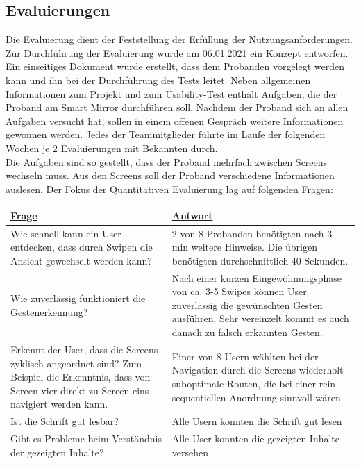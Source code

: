 \documentclass[12pt, a4paper]{scrartcl}
\begin{document}
	\subsection{Evaluierungen}
	Die Evaluierung dient der Feststellung der Erfüllung der Nutzungsanforderungen. Zur Durchführung der Evaluierung wurde am 06.01.2021 ein Konzept entworfen. Ein einseitiges Dokument wurde erstellt, dass dem Probanden vorgelegt werden kann und ihn bei der Durchführung des Tests leitet. Neben allgemeinen Informationen zum Projekt und zum Usability-Test enthält Aufgaben, die der Proband am Smart Mirror durchführen soll. Nachdem der Proband sich an allen Aufgaben versucht hat, sollen in einem offenen Gespräch weitere Informationen gewonnen werden. Jedes der Teammitglieder führte im Laufe der folgenden Wochen je 2 Evaluierungen mit Bekannten durch.\\
	Die Aufgaben sind so gestellt, dass der Proband mehrfach zwischen Screens wechseln muss. Aus den Screens soll der Proband verschiedene Informationen auslesen. Der Fokus der Quantitativen Evaluierung lag auf folgenden Fragen:\\
	\begin{tabularx}{0.95\textwidth}{|X|X|}
		\hline
		\textcolor{tumbleweed}{\underline{\textbf{Frage}}} & \textcolor{tumbleweed}{\underline{\textbf{Antwort}}}\\
		\hline
		Wie schnell kann ein User entdecken, dass durch Swipen die Ansicht gewechselt werden kann? & 2 von 8 Probanden benötigten nach 3 min weitere Hinweise. Die übrigen benötigten durchschnittlich 40 Sekunden.\\
		\hline
		Wie zuverlässig funktioniert die Gestenerkennung?&Nach einer kurzen Eingewöhnungsphase von ca. 3-5 Swipes können User zuverlässig die gewünschten Gesten ausführen. Sehr vereinzelt kommt es auch danach zu falsch erkannten Gesten.\\
		\hline
		Erkennt der User, dass die Screens zyklisch angeordnet sind? Zum Beispiel die Erkenntnis, dass von Screen vier direkt zu Screen eins navigiert werden kann.&Einer von 8 Usern wählten bei der Navigation durch die Screens wiederholt suboptimale Routen, die bei einer rein sequentiellen Anordnung sinnvoll wären\\
		\hline
		Ist die Schrift gut lesbar?&
		Alle Usern konnten die Schrift gut lesen\\
		\hline
		Gibt es Probleme beim Verständnis der gezeigten Inhalte? & Alle User konnten die gezeigten Inhalte versehen\\
		\hline
	\end{tabularx}
		
\end{document}
